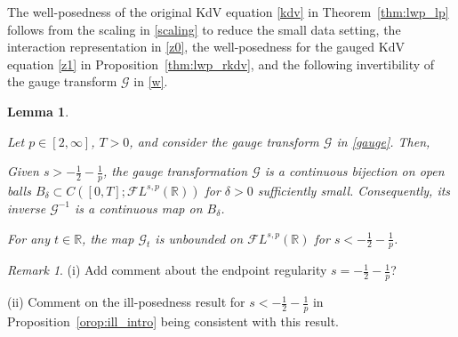 \documentclass[%
11pt,  reqno]{amsart}
\newcommand{\5}{\textup{V}}
\newcommand{\noi}{\noindent}
\newcommand{\FL}{\mathcal{F} L}
\newcommand{\dl}{\delta}
\newtheorem{lemma}[theorem]{Lemma}
\theoremstyle{remark}
\newtheorem{remark}[theorem]{Remark}
\newcommand{\R}{\mathbb{R}}
\newcommand{\Gc}{\mathcal{G}}
\numberwithin{equation}{section}
\numberwithin{theorem}{section}
\begin{document}
The well-posedness of the original KdV equation \eqref{kdv} in Theorem~\ref{thm:lwp_lp} follows from the 
scaling in \eqref{scaling} to reduce the small data setting,
the interaction representation in \eqref{z0}, the well-posedness for the gauged KdV equation \eqref{z1} in Proposition~\ref{thm:lwp_rkdv}, and the following invertibility of the gauge transform $\Gc$ in \eqref{w}.


\begin{lemma}\label{LEM:D}

Let $p\in[2, \infty]$, $T>0$, and consider the gauge transform $\Gc$ in \eqref{gauge}. Then, 

\noi {\rm(i)}
Given $s>-\frac12 - \frac1p$, the gauge transformation $\Gc$ is a continuous bijection on open balls $B_\dl \subset C([0,T]; \FL^{s,p}(\R))$ for $\dl>0$ sufficiently small. 
Consequently, its inverse $\Gc^{-1}$ is a continuous map on $B_\dl$. 

\smallskip
\noi {\rm(ii)} For any $t\in\R$, the map $\Gc_t$ is unbounded on $\FL^{s,p}(\R)$ for $s< - \frac12 - \frac1p$. 


    
\end{lemma}


\begin{remark}
    \rm 
    \color{red}

    (i) Add comment about the endpoint regularity $s= - \frac12 - \frac1p $?

    (ii) Comment on the ill-posedness result for $s<-\frac12 -\frac1p $ in Proposition~\ref{orop:ill_intro} being consistent with this result.
\end{remark}
\end{document}
